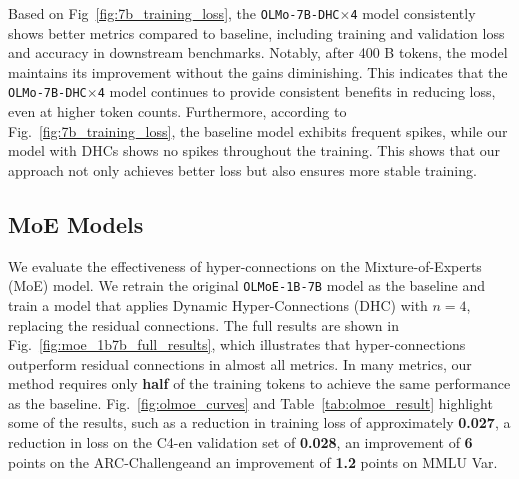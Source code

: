 \documentclass{article} %
\begin{document}
Based on Fig~\ref{fig:7b_training_loss}, the \texttt{OLMo-7B-DHC$\times$4} model consistently shows better metrics compared to baseline, including training and validation loss and accuracy in downstream benchmarks. Notably, after 400 B tokens, the model maintains its improvement without the gains diminishing. This indicates that the \texttt{OLMo-7B-DHC$\times$4} model continues to provide consistent benefits in reducing loss, even at higher token counts. Furthermore, according to Fig.~\ref{fig:7b_training_loss}, the baseline model exhibits frequent spikes, while our model with DHCs shows no spikes throughout the training. This shows that our approach not only achieves better loss but also ensures more stable training.


\subsection{MoE Models}
\label{sec:moe_models}

We evaluate the effectiveness of hyper-connections on the Mixture-of-Experts (MoE) model. We retrain the original \texttt{OLMoE-1B-7B} model as the baseline and train a model that applies Dynamic Hyper-Connections (DHC) with $n=4$, replacing the residual connections. The full results are shown in Fig.~\ref{fig:moe_1b7b_full_results}, which illustrates that hyper-connections outperform residual connections in almost all metrics. In many metrics, our method requires only \textbf{half} of the training tokens to achieve the same performance as the baseline. Fig.~\ref{fig:olmoe_curves} and Table~\ref{tab:olmoe_result} highlight some of the results, such as a reduction in training loss of approximately \textbf{0.027}, a reduction in loss on the C4-en validation set of \textbf{0.028}, an improvement of \textbf{6} points on the ARC-Challengeand an improvement of \textbf{1.2} points on MMLU Var.
\end{document}
